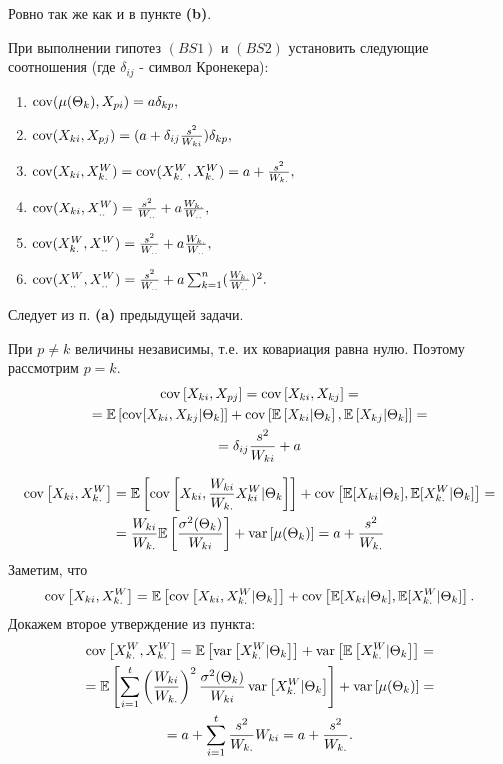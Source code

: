 \partsol{}
Ровно так же как и в пункте {\bf(b)}.


\problem{}
При выполнении гипотез $(BS1)$  и $(BS2)$  установить следующие соотношения (где $\delta_{ij}$  - символ Кронекера): 
\begin{enumerate}
\item $\operatorname*{cov}(\mu(\Theta_k),X_{pi})=a\delta_{kp},$ 
\item $\operatorname*{cov}(X_{ki},X_{pj})=(a+\delta_{ij}\frac{s^2}{W_{ki}})\delta_{kp},$ 
\item $\operatorname*{cov}(X_{ki},X_{k.}^W)=\operatorname*{cov}(X_{k.}^W,X_{k.}^W)=a+\frac{s^2}{W_{k.}},$ 
\item $\operatorname*{cov}(X_{ki},X_{..}^W)=\frac{s^2}{W_{..}}+a\frac{W_{k.}}{W_{..}},$ 
\item $\operatorname*{cov}(X_{k.}^W,X_{..}^W)=\frac{s^2}{W_{..}}+a\frac{W_{k.}}{W_{..}},$ 
\item $\operatorname*{cov}(X_{..}^W,X_{..}^W)=\frac{s^2}{W_{..}}+a\sum_{k=1}^n(\frac{W_{k.}}{W_{..}})^2.$ 
\end{enumerate}
\solution{}
\partsol{}
Следует из п. {\bf(a)} предыдущей задачи.

\partsol{}
При $p\neq k$ величины независимы, т.е. их ковариация равна нулю. Поэтому рассмотрим $p = k$.
\begin{multline}
    \operatorname*{cov}\left[X_{ki}, X_{pj}\right] =\operatorname*{cov}\left[X_{ki}, X_{kj}\right] =\\= \mathbb{E}\left[\operatorname*{cov}[X_{ki}, X_{kj}\vert \Theta_k]\right] + \operatorname*{cov}\left[\mathbb{E}\left[X_{ki}\vert \Theta_k\right], \mathbb{E}\left[X_{kj}\vert \Theta_k\right]\right] =\\=
    \delta_{ij}\frac{s^2}{W_{ki}}+a
\end{multline}

\partsol{}
\begin{align}
    \operatorname*{cov}\left[X_{ki},X_{k.}^W\right] & = \mathbb{E}\left[\operatorname*{cov}\left[X_{ki},\frac{W_{ki}}{W_{k.}}X_{ki}^W\vert \Theta_k\right]\right] + \operatorname*{cov}\left[\mathbb{E}[X_{ki}\vert \Theta_k],\mathbb{E}[X_{k.}^W\vert\Theta_k]\right] =\nonumber\\
                                     & = \frac{W_{ki}}{W_{k.}} \mathbb{E}\left[\frac{\sigma^2(\Theta_k)}{W_{ki}}\right] + \operatorname*{var}\left[\mu(\Theta_k)\right] = a + \frac{s^2}{W_{k.}}
\end{align}
Заметим, что 
\begin{equation}
    \operatorname*{cov}\left[X_{ki},X_{k.}^W\right] = \mathbb{E}\left[\operatorname*{cov}\left[X_{ki},X_{k.}^W\vert \Theta_k\right]\right] + \operatorname*{cov}\left[\mathbb{E}[X_{ki}\vert \Theta_k],\mathbb{E}[X_{k.}^W\vert\Theta_k]\right].
\end{equation}
Докажем второе утверждение из пункта:
\begin{multline}
    \operatorname*{cov}\left[X_{k.}^W,X_{k.}^W\right] = \mathbb{E}\left[\operatorname*{var}\left[X_{k.}^W\vert \Theta_k\right]\right] + \operatorname*{var}\left[\mathbb{E}\left[X_{k.}^W\vert \Theta_k\right]\right] =\\=
    \mathbb{E}\left[\sum_{i=1}^t\left(\frac{W_{ki}}{W_{k.}}\right)^2 \frac{\sigma^2(\Theta_k)}{W_{ki}}\operatorname*{var}\left[X_{k.}^W\vert \Theta_k\right]\right] +\operatorname*{var}\left[\mu(\Theta_k)\right] =\\=
    a + \sum_{i=1}^t\frac{s^2}{W_{k.}}W_{ki} =a + \frac{s^2}{W_{k.}}.
\end{multline}

